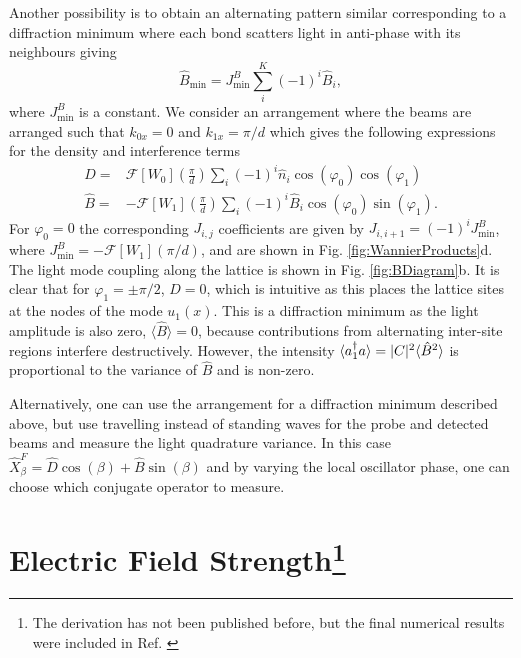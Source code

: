 Another possibility is to obtain an alternating pattern similar
corresponding to a diffraction minimum where each bond scatters light
in anti-phase with its neighbours giving
\begin{equation}
  \hat{B}_\mathrm{min} = J^B_\mathrm{min} \sum_i^K (-1)^i \hat{B}_i,
\end{equation}
where $J^B_\mathrm{min}$ is a constant. We consider an arrangement
where the beams are arranged such that $k_{0x} = 0$ and
$k_{1x} = \pi/d$ which gives the following expressions for the density
and interference terms
\begin{align}
  \label{eq:DMin}
  \hat{D} = & \mathcal{F}[W_0]\left(\frac{\pi}{d}\right) \sum_i (-1)^i \hat{n}_i
              \cos(\varphi_0) \cos(\varphi_1) \nonumber \\ 
  \hat{B} = & -\mathcal{F}[W_1]\left(\frac{\pi}{d}\right) \sum_i (-1)^i \hat{B}_i
              \cos(\varphi_0) \sin(\varphi_1).
\end{align}
For $\varphi_0 = 0$ the corresponding $J_{i,j}$ coefficients are given
by $J_{i,i+1} = (-1)^i J^B_\mathrm{min}$, where
$J^B_\mathrm{min} = -\mathcal{F}[W_1](\pi / d)$, and are shown in
Fig. \ref{fig:WannierProducts}d. The light mode coupling along the
lattice is shown in Fig. \ref{fig:BDiagram}b. It is clear that for
$\varphi_1 = \pm \pi/2$, $\hat{D} = 0$, which is intuitive as this
places the lattice sites at the nodes of the mode $u_1(x)$. This is a
diffraction minimum as the light amplitude is also zero,
$\langle \hat{B} \rangle = 0$, because contributions from alternating
inter-site regions interfere destructively. However, the intensity
$\langle a^\dagger_1 a \rangle = |C|^2 \langle \hat{B}^2 \rangle$ is
proportional to the variance of $\hat{B}$ and is non-zero.

Alternatively, one can use the arrangement for a diffraction minimum
described above, but use travelling instead of standing waves for the
probe and detected beams and measure the light quadrature variance.
In this case
$\hat{X}^F_\beta = \hat{D} \cos(\beta) + \hat{B} \sin(\beta)$ and by
varying the local oscillator phase, one can choose which conjugate
operator to measure.

\section[Electric Field Strength]
        {Electric Field Strength\footnote{The derivation has not been
            published before, but the final numerical results were
            included in Ref. \cite{kozlowski2015}}}
\label{sec:Efield}

